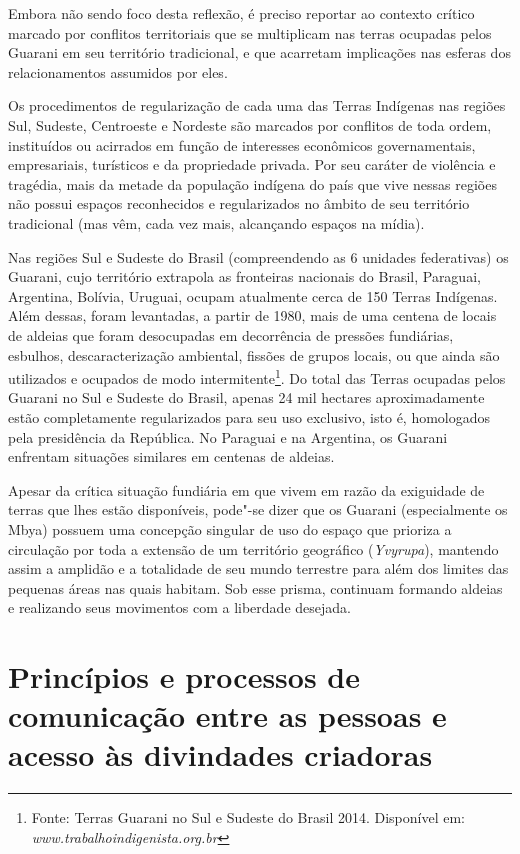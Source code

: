 Embora não sendo foco desta reflexão, é preciso reportar ao contexto
crítico marcado por conflitos territoriais que se multiplicam nas
terras ocupadas pelos Guarani em seu território tradicional, e que
acarretam implicações nas esferas dos relacionamentos assumidos por
eles. 

Os procedimentos de regularização de cada uma das Terras Indígenas nas
regiões Sul, Sudeste, Centroeste e Nordeste são marcados por conflitos
de toda ordem, instituídos ou acirrados em função de interesses
econômicos governamentais, empresariais, turísticos e da propriedade
privada. Por seu caráter de violência e tragédia, mais da metade da
população indígena do país que vive nessas regiões não possui espaços
reconhecidos e regularizados no âmbito de seu território tradicional
(mas vêm, cada vez mais, alcançando espaços na mídia).

Nas regiões Sul e Sudeste do Brasil (compreendendo as 6 unidades
federativas) os Guarani, cujo território extrapola as fronteiras
nacionais do Brasil, Paraguai, Argentina, Bolívia, Uruguai, ocupam
atualmente cerca de 150 Terras Indígenas. Além dessas, foram
levantadas, a partir de 1980, mais de uma centena de locais de aldeias
que foram desocupadas em decorrência de pressões fundiárias, esbulhos,
descaracterização ambiental, fissões de grupos locais, ou que ainda são
utilizados e ocupados de modo intermitente\footnote{Fonte: Terras
Guarani no Sul e Sudeste do Brasil 2014. Disponível em:
\emph{www.trabalhoindigenista.org.br}}. Do total das
Terras ocupadas pelos Guarani no Sul e Sudeste do Brasil, apenas 24 mil
hectares aproximadamente estão completamente regularizados para seu uso
exclusivo, isto é, homologados pela presidência da República. No
Paraguai e na Argentina, os Guarani enfrentam situações similares em
centenas de aldeias. 

Apesar da crítica situação fundiária em que vivem em razão da exiguidade
de terras que lhes estão disponíveis, pode"-se dizer que os Guarani
(especialmente os Mbya) possuem uma concepção singular de uso do espaço
que prioriza a circulação por toda a extensão de um território
geográfico (\emph{Yvyrupa}), mantendo assim a amplidão e a totalidade de seu
mundo terrestre para além dos limites das pequenas áreas nas quais
habitam. Sob esse prisma, continuam formando aldeias e realizando seus
movimentos com a liberdade desejada.

\section{Princípios e processos de comunicação entre as pessoas e acesso às
divindades criadoras} 

